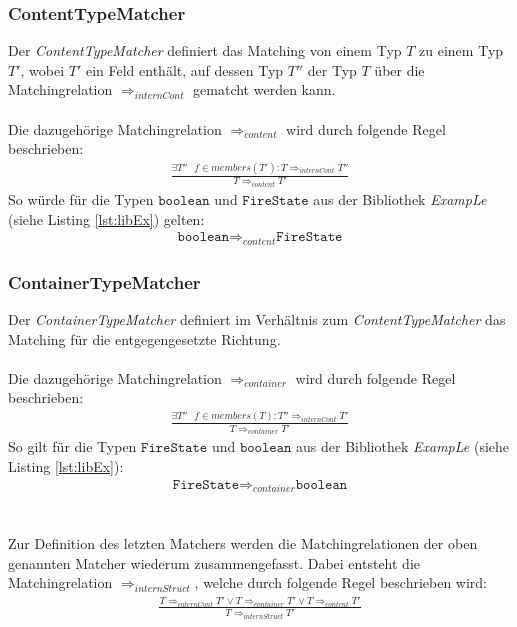 \subsubsection{ContentTypeMatcher}
Der \emph{ContentTypeMatcher} definiert das Matching von einem Typ $T$ zu einem Typ $T'$, wobei $T'$ ein Feld enthält, auf dessen Typ $T''$ der Typ $T$ über die Matchingrelation $\Rightarrow_{internCont}$ gematcht werden kann.
\\\\
Die dazugehörige Matchingrelation $\Rightarrow_{content}$ wird durch folgende Regel beschrieben:
\begin{gather*}
\frac{\exists \mathit{T''\text{ }f}\in members(T'): T \Rightarrow_{internCont} T''}{T \Rightarrow_{content} T'}
\end{gather*}
\noindent
So würde für die Typen $\texttt{boolean}$ und $\texttt{FireState}$ aus der Bibliothek \emph{ExampLe} (siehe Listing \ref{lst:libEx}) gelten: 
\begin{gather*}
\texttt{boolean} \Rightarrow_{content} \texttt{FireState}
\end{gather*}
\subsubsection{ContainerTypeMatcher}
Der \emph{ContainerTypeMatcher} definiert im Verhältnis zum \emph{ContentTypeMatcher} das Matching für die entgegengesetzte Richtung.
\\\\
Die dazugehörige Matchingrelation $\Rightarrow_{container}$ wird durch folgende Regel beschrieben:
\begin{gather*}
\frac{\exists \mathit{T''\text{ }f}\in members(T): T'' \Rightarrow_{internCont} T'}{T \Rightarrow_{container} T'}
\end{gather*}
\noindent
So gilt für die Typen $\texttt{FireState}$ und $\texttt{boolean}$ aus der Bibliothek \emph{ExampLe} (siehe Listing \ref{lst:libEx}): 
\begin{gather*}
\texttt{FireState} \Rightarrow_{container} \texttt{boolean}
\end{gather*}
\\\\
Zur Definition des letzten Matchers werden die Matchingrelationen der oben genannten Matcher wiederum zusammengefasst. Dabei entsteht die Matchingrelation $\Rightarrow_{internStruct}$, welche durch folgende Regel beschrieben wird:
\begin{gather*}
\frac{T \Rightarrow_{internCont}T' \vee T \Rightarrow_{container} T' \vee T \Rightarrow_{content} T'}{T \Rightarrow_{internStruct}T'}
\end{gather*}
